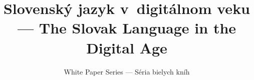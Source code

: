 %                                                                             
%
%
% 

\usepackage{polyglossia}
\usepackage{tipa}
\usepackage{nth}


\title{Slovenský jazyk v~di\-gi\-tál\-nom veku --- The \mbox{Slovak} Language in the Digital Age}

\subtitle{White Paper Series --- Séria bielych kníh}

